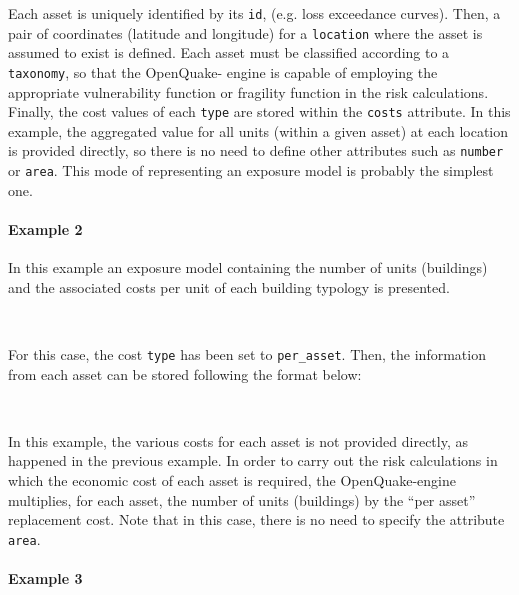 Each \gls{asset} is uniquely identified by its \Verb+id+, (e.g. loss
exceedance curves). Then, a pair of coordinates (latitude and longitude) for a
\Verb+location+ where the asset is assumed to exist is defined. Each asset
must be classified according to a \Verb+taxonomy+, so that the OpenQuake-
engine is capable of employing the appropriate \gls{vulnerability function} or
\gls{fragility function} in the risk calculations. Finally, the cost values of
each \Verb+type+ are stored within the \Verb+costs+ attribute. In this
example, the aggregated value for all units (within a given asset) at each
location is provided directly, so there is no need to define other attributes
such as \Verb+number+ or \Verb+area+. This mode of representing an exposure
model is probably the simplest one.


\paragraph{Example 2}

In this example an \gls{exposure model} containing the number of units
(buildings) and the associated costs per unit of each building typology is
presented.

\inputminted[firstline=8,firstnumber=8,lastline=18,fontsize=\footnotesize,frame=single,linenos,bgcolor=lightgray]{xml}{oqum/risk/Verbatim/input_exposure_cunit.xml}\\

For this case, the cost \Verb+type+ has been set to \Verb+per_asset+. Then, the
information from each asset can be stored following the format below:

\inputminted[firstline=19,firstnumber=19,lastline=29,fontsize=\footnotesize,frame=single,linenos,bgcolor=lightgray]{xml}{oqum/risk/Verbatim/input_exposure_cunit.xml}\\

In this example, the various costs for each asset is not provided directly, as
happened in the previous example. In order to carry out the risk calculations
in which the economic cost of each asset is required, the OpenQuake-engine
multiplies, for each asset, the number of units (buildings) by the ``per
asset'' replacement cost. Note that in this case, there is no need to specify
the attribute \Verb+area+.


\paragraph{Example 3}

